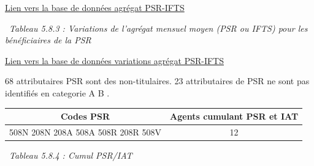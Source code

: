 \href{../Bases/Remunerations/beneficiaires.PSR.IFTS.csv}{Lien vers la base
de données agrégat PSR-IFTS}

~\emph{Tableau 5.8.3 : Variations de l'agrégat mensuel moyen (PSR ou
IFTS) pour les bénéficiaires de la PSR}

\href{../Bases/Remunerations/beneficiaires.PSR.IFTS.Variation.csv}{Lien
vers la base de données variations agrégat PSR-IFTS}

68 attributaires PSR sont des non-titulaires. 23 attributaires de PSR ne
sont pas identifiés en categorie A B .

\begin{longtable}[]{@{}cc@{}}
\toprule
Codes PSR & Agents cumulant PSR et IAT\tabularnewline
\midrule
\endhead
508N 208N 208A 508A 508R 208R 508V & 12\tabularnewline
\bottomrule
\end{longtable}

~\emph{Tableau 5.8.4 : Cumul PSR/IAT}

